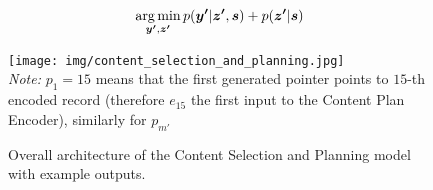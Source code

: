 \begin{equation} \label{equation:argmin_csap_model}
    \operatorname*{arg\,min}_{\boldsymbol{y'}, \boldsymbol{z'}}{p(\boldsymbol{y'}|\boldsymbol{z'}, \boldsymbol{s}) + p(\boldsymbol{z'} | \boldsymbol{s})}
\end{equation}

\begin{figure}[!h]
    \centering
    \texttt{[image: img/content\_selection\_and\_planning.jpg]}
    \footnotesize{\\ \textit{Note:} $p_1 = 15$ means that the first generated pointer points to $15$-th encoded record (therefore $e_{15}$ the first input to the Content Plan Encoder), similarly for $p_{m'}$}
    \caption{Overall architecture of the Content Selection and Planning model with example outputs.} \label{figure:overal_architecture_csap}
\end{figure}
